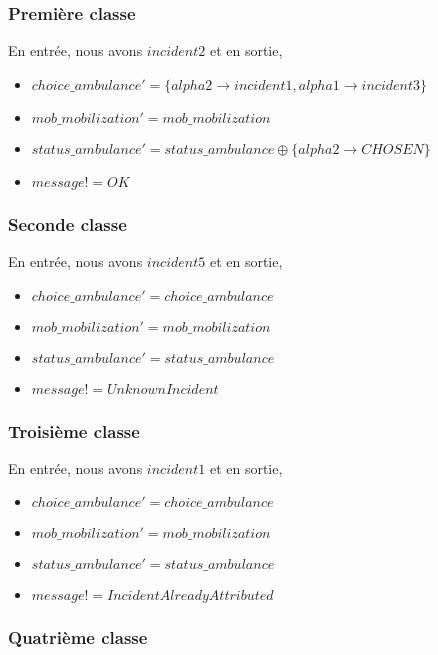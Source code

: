 \documentclass{report}
\begin{document}
\subsubsection{Première classe}

En entrée, nous avons $incident2$ et en sortie, 
\begin{itemize}
	\item $choice\_ambulance' = \{alpha2 \rightarrow incident1, alpha1 \rightarrow incident3 \}$
	\item $mob\_mobilization' = mob\_mobilization$
	\item $status\_ambulance' = status\_ambulance \oplus \{alpha2 \rightarrow CHOSEN \}$
	\item $message! = OK$
\end{itemize}

\subsubsection{Seconde classe}

En entrée, nous avons $incident5$ et en sortie, 
\begin{itemize}
	\item $choice\_ambulance' = choice\_ambulance$
	\item $mob\_mobilization' = mob\_mobilization$
	\item $status\_ambulance' = status\_ambulance$
	\item $message! = UnknownIncident$
\end{itemize}

\subsubsection{Troisième classe}

En entrée, nous avons $incident1$ et en sortie, 
\begin{itemize}
	\item $choice\_ambulance' = choice\_ambulance$
	\item $mob\_mobilization' = mob\_mobilization$
	\item $status\_ambulance' = status\_ambulance$
	\item $message! = IncidentAlreadyAttributed$
\end{itemize}

\subsubsection{Quatrième classe}
\end{document}
